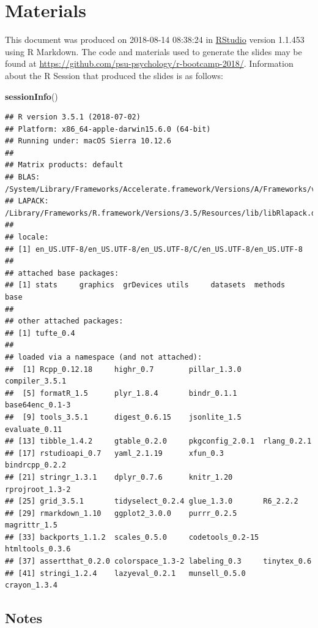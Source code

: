 \documentclass[]{article}
\newenvironment{Shaded}{\begin{snugshade}}{\end{snugshade}}
\newcommand{\KeywordTok}[1]{\textcolor[rgb]{0.13,0.29,0.53}{\textbf{#1}}}
\newcommand{\NormalTok}[1]{#1}
\begin{document}
\section{Materials}\label{materials}

This document was produced on 2018-08-14 08:38:24 in
\href{http://rstudio.com}{RStudio} version 1.1.453 using R Markdown. The
code and materials used to generate the slides may be found at
\url{https://github.com/psu-psychology/r-bootcamp-2018/}. Information
about the R Session that produced the slides is as follows:

\begin{Shaded}
\begin{Highlighting}[]
\KeywordTok{sessionInfo}\NormalTok{()}
\end{Highlighting}
\end{Shaded}

\begin{verbatim}
## R version 3.5.1 (2018-07-02)
## Platform: x86_64-apple-darwin15.6.0 (64-bit)
## Running under: macOS Sierra 10.12.6
## 
## Matrix products: default
## BLAS: /System/Library/Frameworks/Accelerate.framework/Versions/A/Frameworks/vecLib.framework/Versions/A/libBLAS.dylib
## LAPACK: /Library/Frameworks/R.framework/Versions/3.5/Resources/lib/libRlapack.dylib
## 
## locale:
## [1] en_US.UTF-8/en_US.UTF-8/en_US.UTF-8/C/en_US.UTF-8/en_US.UTF-8
## 
## attached base packages:
## [1] stats     graphics  grDevices utils     datasets  methods   base     
## 
## other attached packages:
## [1] tufte_0.4
## 
## loaded via a namespace (and not attached):
##  [1] Rcpp_0.12.18     highr_0.7        pillar_1.3.0     compiler_3.5.1  
##  [5] formatR_1.5      plyr_1.8.4       bindr_0.1.1      base64enc_0.1-3 
##  [9] tools_3.5.1      digest_0.6.15    jsonlite_1.5     evaluate_0.11   
## [13] tibble_1.4.2     gtable_0.2.0     pkgconfig_2.0.1  rlang_0.2.1     
## [17] rstudioapi_0.7   yaml_2.1.19      xfun_0.3         bindrcpp_0.2.2  
## [21] stringr_1.3.1    dplyr_0.7.6      knitr_1.20       rprojroot_1.3-2 
## [25] grid_3.5.1       tidyselect_0.2.4 glue_1.3.0       R6_2.2.2        
## [29] rmarkdown_1.10   ggplot2_3.0.0    purrr_0.2.5      magrittr_1.5    
## [33] backports_1.1.2  scales_0.5.0     codetools_0.2-15 htmltools_0.3.6 
## [37] assertthat_0.2.0 colorspace_1.3-2 labeling_0.3     tinytex_0.6     
## [41] stringi_1.2.4    lazyeval_0.2.1   munsell_0.5.0    crayon_1.3.4
\end{verbatim}

\subsection{Notes}\label{notes}
\end{document}
